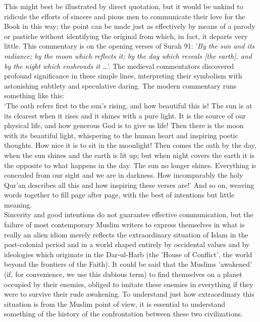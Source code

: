 \documentclass[10pt, twoside]{book}
\begin{document}
This might best be illustrated by direct quotation, but it would be unkind to ridicule the efforts of sincere and pious men to communicate their love for the Book in this way; the point can be made just as effectively by means of a parody or pastiche without identifying the original from which, in fact, it departs very little. This commentary is on the opening verses of Surah 91: '\emph{By the sun and its radiance; by the moon which reflects it; by the day which reveals [the earth], and by the night which enshrouds it \ldots{}}'. The medieval commentators discovered profound significance in these simple lines, interpreting their symbolism with astonishing subtlety and speculative daring. The modern commentary runs something like this:\\

`The oath refers first to the sun's rising, and how beautiful this is! The sun is at its clearest when it rises and it shines with a pure light. It is the source of our physical life, and how generous God is to give us life! Then there is the moon with its beautiful light, whispering to the human heart and inspiring poetic thoughts. How nice it is to sit in the moonlight! Then comes the oath by the day, when the sun shines and the earth is lit up; but when night covers the earth it is the opposite to what happens in the day. The sun no longer shines. Everything is concealed from our sight and we are in darkness. How incomparably the holy Qur'an describes all this and how inspiring these verses are!' And so on, weaving words together to fill page after page, with the best of intentions but little meaning. \\

Sincerity and good intentions do not guarantee effective communication, but the failure of most contemporary Muslim writers to express themselves in what is really an alien idiom merely reflects the extraordinary situation of Islam in the post\hyp{}colonial period and in a world shaped entirely by occidental values and by ideologies which originate in the Dar\hyp{}ul\hyp{}Harb (the 'House of Conflict', the world beyond the frontiers of the Faith). It could be said that the Muslims 'awakened' (if, for convenience, we use this dubious term) to find themselves on a planet occupied by their enemies, obliged to imitate these enemies in everything if they were to survive their rude awakening. To understand just how extraordinary this situation is from the Muslim point of view, it is essential to understand something of the history of the confrontation between these two civilizations. \\
\end{document}

